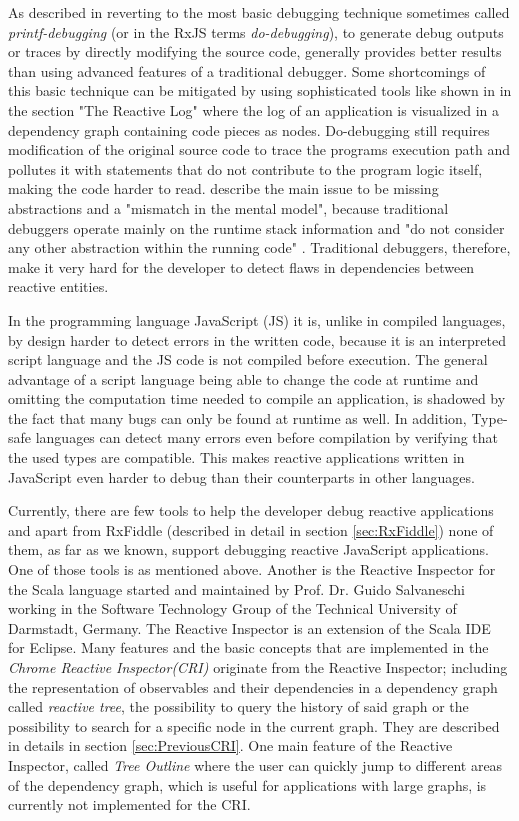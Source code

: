 As described in \cite{MSDN_DebugginObservables} reverting to the most basic debugging technique sometimes called \emph{printf-debugging} (or in the RxJS terms \emph{do-debugging}), to generate debug outputs or traces by directly modifying the source code, generally provides better results than using advanced features of a traditional debugger. Some shortcomings of this basic technique can be mitigated by using sophisticated tools like shown in \cite{ShinyGraphFromLog} in the section "The Reactive Log" where the log of an application is visualized in a dependency graph containing code pieces as nodes. Do-debugging still requires modification of the original source code to trace the programs execution path and pollutes it with statements that do not contribute to the program logic itself, making the code harder to read. \cite{PaperReactiveProgramming} describe the main issue to be missing abstractions and a "mismatch in the mental model", because traditional debuggers operate mainly on the runtime stack information and "do not consider any other abstraction within the running code" \cite{ThesisAbbas}. Traditional debuggers, therefore, make it very hard for the developer to detect flaws in dependencies between reactive entities.

In the programming language JavaScript (JS) it is, unlike in compiled languages, by design harder to detect errors in the written code, because it is an interpreted script language and the JS code is not compiled before execution. The general advantage of a script language being able to change the code at runtime and omitting the computation time needed to compile an application, is shadowed by the fact that many bugs can only be found at runtime as well. In addition, Type-safe languages can detect many errors even before compilation by verifying that the used types are compatible. This makes reactive applications written in JavaScript even harder to debug than their counterparts in other languages.

Currently, there are few tools to help the developer debug reactive applications and apart from RxFiddle (described in detail in section \ref{sec:RxFiddle}) none of them, as far as we known, support debugging reactive JavaScript applications. One of those tools is \cite{ShinyGraphFromLog} as mentioned above. Another is the Reactive Inspector for the Scala language \cite{ReactiveInspector} started and maintained by Prof. Dr. Guido Salvaneschi working in the Software Technology Group of the Technical University of Darmstadt, Germany.
The Reactive Inspector is an extension of the Scala IDE for Eclipse. Many features and the basic concepts that are implemented in the \emph{Chrome Reactive Inspector(CRI)} originate from the Reactive Inspector; including the representation of observables and their dependencies in a dependency graph called \emph{reactive tree}, the possibility to query the history of said %
 graph or the possibility to search for a specific node in the current graph. They are described in details in section \ref{sec:PreviousCRI}. One main feature of the Reactive Inspector, called \emph{Tree Outline} where the user can quickly jump to different areas of the dependency graph, which is useful for applications with large graphs, is currently not implemented for the CRI.

